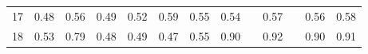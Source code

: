 \documentclass[twoside,11pt]{article}
\begin{document}
\begin{table}[H]
{\begin{tabular}{cccccccclclcc}
\multicolumn{1}{|c|}{17}                                                                          & \multicolumn{1}{c|}{0.48}                                                           & \multicolumn{1}{c|}{0.56}                                                                      & \multicolumn{1}{c|}{0.49}                                                                & \multicolumn{1}{c|}{0.52}                                                                & \multicolumn{1}{c|}{\cellcolor[HTML]{FFCCC9}0.59}                                        & \multicolumn{1}{c|}{0.55}                                                                   & \multicolumn{1}{c|}{0.54}                                                                   & \multicolumn{1}{l|}{}                                                                          & \multicolumn{1}{c|}{\cellcolor[HTML]{ECF4FF}0.57}                                           & \multicolumn{1}{l|}{}                    & \multicolumn{1}{c|}{0.56}                                                                      & \multicolumn{1}{c|}{0.58}                                                                      \\ \cline{1-1}
\multicolumn{1}{|c|}{18}                                                                          & \multicolumn{1}{c|}{0.53}                                                           & \multicolumn{1}{c|}{0.79}                                                                      & \multicolumn{1}{c|}{0.48}                                                                & \multicolumn{1}{c|}{0.49}                                                                & \multicolumn{1}{c|}{0.47}                                                                & \multicolumn{1}{c|}{0.55}                                                                   & \multicolumn{1}{c|}{\cellcolor[HTML]{ECF4FF}0.90}                                           & \multicolumn{1}{l|}{}                                                                          & \multicolumn{1}{c|}{\cellcolor[HTML]{FFCCC9}0.92}                                           & \multicolumn{1}{l|}{}                    & \multicolumn{1}{c|}{0.90}                                                                      & \multicolumn{1}{c|}{0.91}                                                                      \\ \cline{1-1}

\end{tabular}}
\end{table}
\end{document}
